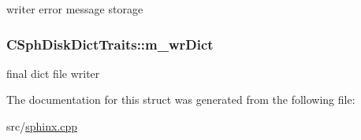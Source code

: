 writer error message storage 

\hypertarget{structCSphDiskDictTraits_a26d5a54b1e88f3d32123f1d413abbf8c}{
\subsubsection[{m\-\_\-wr\-Dict}]{ C\-Sph\-Disk\-Dict\-Traits\-::m\-\_\-wr\-Dict\hspace{0.3cm}{\ttfamily [protected]}}}\label{structCSphDiskDictTraits_a26d5a54b1e88f3d32123f1d413abbf8c}


final dict file writer 



The documentation for this struct was generated from the following file\-:\begin{DoxyCompactItemize}
\item 
src/\hyperlink{sphinx_8cpp}{sphinx.\-cpp}\end{DoxyCompactItemize}
